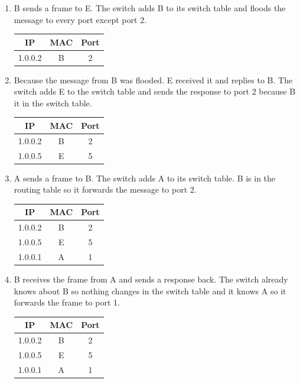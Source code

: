 \documentclass[12pt, a4paper]{article}
\begin{document}
\begin{enumerate}[i]
	\item %
	B sends a frame to E. The switch adds B to its switch table and floods the message to every port except port 2.

	\begin{tabular}{|c|c|c|}
		\hline
		\textbf{IP} & \textbf{MAC} & \textbf{Port}\\\hline
		1.0.0.2 & B & 2\\\hline
	\end{tabular}

	\item %
	Because the message from B was flooded. E received it and replies to B. The switch adds E to the switch table and sends the response to port 2 because B it in the switch table.

	\begin{tabular}{|c|c|c|}
		\hline
		\textbf{IP} & \textbf{MAC} & \textbf{Port}\\\hline
		1.0.0.2 & B & 2\\\hline
		1.0.0.5 & E & 5\\\hline
	\end{tabular}

	\item %
	A sends a frame to B. The switch adds A to its switch table. B is in the routing table so it forwards the message to port 2.

	\begin{tabular}{|c|c|c|}
		\hline
		\textbf{IP} & \textbf{MAC} & \textbf{Port}\\\hline
		1.0.0.2 & B & 2\\\hline
		1.0.0.5 & E & 5\\\hline
		1.0.0.1 & A & 1\\\hline
	\end{tabular}

	\item %
	B receives the frame from A and sends a response back. The switch already knows about B so nothing changes in the switch table and it knows A so it forwards the frame to port 1.

	\begin{tabular}{|c|c|c|}
		\hline
		\textbf{IP} & \textbf{MAC} & \textbf{Port}\\\hline
		1.0.0.2 & B & 2\\\hline
		1.0.0.5 & E & 5\\\hline
		1.0.0.1 & A & 1\\\hline
	\end{tabular}
\end{enumerate}
\end{document}
